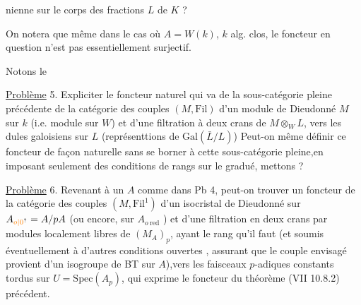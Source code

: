 nienne sur le corps des fractions  $L$ de $K$ ?

On notera que même dans le cas où $A=W(k)$, $k$ alg. clos, le
foncteur en question n'est pas  essentiellement surjectif.

Notons le

\uline{Problème} 5.  Expliciter le foncteur naturel qui va de la sous-catégorie pleine précédente de la catégorie des couples  $(M,\mathrm{Fil})$ d'un module
de Dieudonné $M$ sur  $k$ (i.e.  module sur $W$) et d'une filtration à
deux crans de $M\otimes_W L$, vers les dules galoisiens sur $L$ (représenttions
de $\mathrm{Gal}(\bar L/L)$) Peut-on même
définir ce foncteur  de façon naturelle sans se
borner à cette sous-catégorie pleine,en imposant seulement des conditions de rangs sur le gradué, mettons ?

\uline{Problème} 6. Revenant à un $A$ comme dans Pb 4, peut-on trouver un foncteur  de la catégorie des couples $(M,\mathrm{Fil}^{1})$ d'un isocristal
de Dieudonné  sur $A_{\unsure{o|0}}=A/pA$ (ou encore, sur $A_{o\ \mathrm{red}}$ ) et d'une filtration en deux crans par modules localement libres de $(M_A)_p$, ayant le
rang qu'il faut\deleted{,} (et soumis éventuellement à d'autres conditions
ouvertes , assurant que le couple envisagé provient d'un isogroupe de
BT sur $A$),vers les faisceaux $p$-adiques constants tordus sur $U=\mathrm{Spec}(A_p)$,
qui exprime le foncteur du théorème (VII 10.8.2) précédent.



